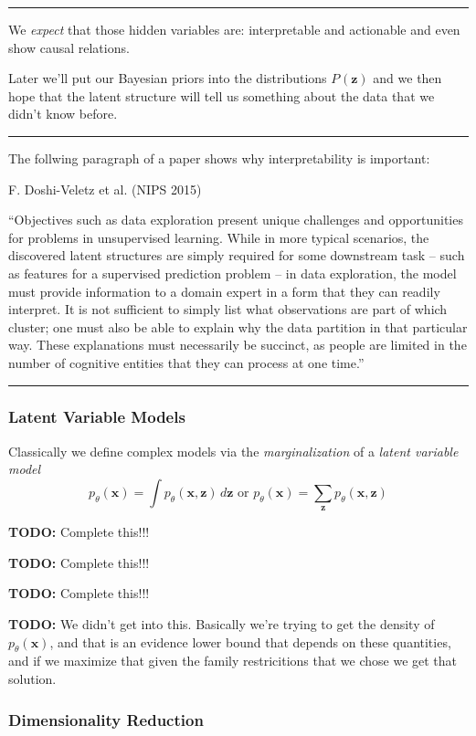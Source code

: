 \documentclass[a2paper,8pt]{extarticle}
\newcommand{\tcgr}[1]{\textcolor{lighttext}{#1}}
\newcommand{\tcgr}[1]{\textcolor{gray}{#1}}
\newcommand{\Prob}[2][]{P_{#1}\left( #2 \right)}
\renewcommand{\vec}[1]{\mathbf{#1}}
\newcommand{\vx}{\vec{x}}
\newcommand{\vz}{\vec{z}}
\newcommand{\todo}[1]{\textbf{TODO:} #1}
\newcommand{\todo}[1]{%
}
\newcommand{\sep}{\vspace{0pt}\noindent\hrule\vspace{0pt}}
\newcommand{\sep}{\vspace{5pt}\noindent\hrule\vspace{5pt}}
\begin{document}
\begin{landscape}
\begin{multicols*}{7}
\sep

We \emph{expect} that those hidden variables are: interpretable and actionable
and even show causal relations.

Later we'll put our Bayesian priors into the distributions $\Prob{\vz}$ and we
then hope that the latent structure will tell us something about the data that
we didn't know before.

\sep

The follwing paragraph of a paper shows why interpretability is important:

F. Doshi-Veletz et al. (NIPS 2015)

\tcgr{``Objectives such as data exploration present unique challenges and
opportunities for problems in unsupervised learning. While in more typical scenarios, the
discovered latent structures are simply required for some downstream task – such
as features for a supervised prediction problem – in data exploration, the model
must provide information to a domain expert in a form that they can readily
interpret. It is not sufficient to simply list what observations are part of
which cluster; one must also be able to explain why the data partition in that
particular way. These explanations must necessarily be succinct, as people are
limited in the number of cognitive entities that they can process at one
time.''}

\sep

\subsubsection{Latent Variable Models}

Classically we define complex models via the \emph{marginalization} of a
\emph{latent variable model}
\[
p_\theta(\vx)=\int p_\theta(\vx,\vz)\,d\vz
\text{ or }
p_\theta(\vx)=\sum_{\vz} p_\theta(\vx,\vz)
\]

\todo{Complete this!!!}

\todo{Complete this!!!}

\todo{Complete this!!!}

\todo{We didn't get into this. Basically we're trying to get the density of
$p_\theta(\vx)$, and that is an evidence lower bound that depends on these
quantities, and if we maximize that given the family restricitions that we
chose we get that solution.}

\subsubsection{Dimensionality Reduction}


\end{multicols*}
\end{landscape}
\end{document}
